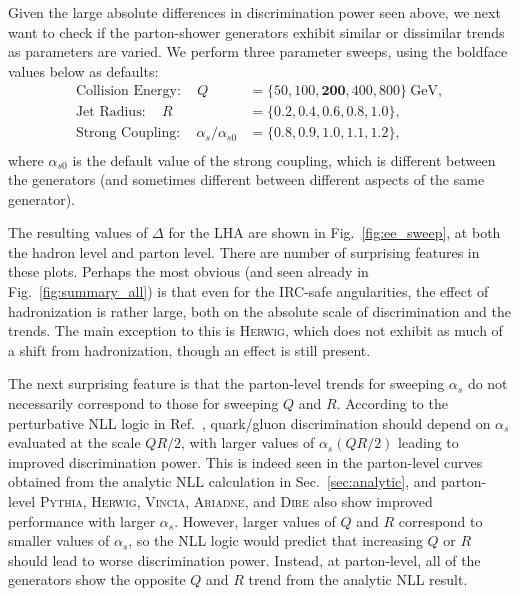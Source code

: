 \documentclass[11pt,letterpaper]{article}
\newcommand{\GeV}{\text{GeV}}
\DeclareRobustCommand{\Sec}[1]{Sec.~\ref{#1}}
\DeclareRobustCommand{\Fig}[1]{Fig.~\ref{#1}}
\DeclareRobustCommand{\Ref}[1]{Ref.~\cite{#1}}
\begin{document}
Given the large absolute differences in discrimination power seen above, we next want to check if the parton-shower generators exhibit similar or dissimilar trends as parameters are varied.  We perform three parameter sweeps, using the boldface values below as defaults:
\begin{equation}
\label{eq:ee_sweep_values}
\begin{aligned}
\text{Collision Energy}: \quad Q &= \{ 50, 100, \mathbf{200}, 400, 800\}~\GeV, \\
\text{Jet Radius}: \quad R &= \{ 0.2, 0.4, \mathbf{0.6}, 0.8, 1.0\}, \\
\text{Strong Coupling}: \quad \alpha_s / \alpha_{s0} &= \{0.8,0.9,\mathbf{1.0},1.1,1.2\}, \\
\end{aligned}
\end{equation}
where $\alpha_{s0}$ is the default value of the strong coupling, which is different between the generators (and sometimes different between different aspects of the same generator).

The resulting values of $\Delta$ for the LHA are shown in \Fig{fig:ee_sweep}, at both the hadron level and parton level.   There are number of surprising features in these plots.  Perhaps the most obvious (and seen already in \Fig{fig:summary_all}) is that even for the IRC-safe angularities, the effect of hadronization is rather large, both on the absolute scale of discrimination and the trends.  The main exception to this is \textsc{Herwig}, which does not exhibit as much of a shift from hadronization, though an effect is still present.

The next surprising feature is that the parton-level trends for sweeping $\alpha_s$ do not necessarily correspond to those for sweeping $Q$ and $R$.  According to the perturbative NLL logic in \Ref{Larkoski:2013eya}, quark/gluon discrimination should depend on $\alpha_s$ evaluated at the scale $Q R / 2$, with larger values of $\alpha_s(Q R / 2)$ leading to improved discrimination power.  This is indeed seen in the parton-level curves obtained from the analytic NLL calculation in \Sec{sec:analytic}, and parton-level \textsc{Pythia}, \textsc{Herwig}, \textsc{Vincia}, \textsc{Ariadne}, and \textsc{Dire} also show improved performance with larger $\alpha_s$.  However, larger values of $Q$ and $R$ correspond to smaller values of $\alpha_s$, so the NLL logic would predict that increasing $Q$ or $R$ should lead to worse discrimination power.  Instead, at parton-level, all of the generators show the opposite $Q$ and $R$ trend from the analytic NLL result.
\end{document}
